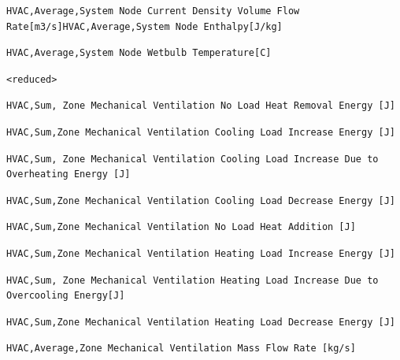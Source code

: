 \begin{lstlisting}
HVAC,Average,System Node Current Density Volume Flow Rate[m3/s]HVAC,Average,System Node Enthalpy[J/kg]
\end{lstlisting}

\begin{lstlisting}
HVAC,Average,System Node Wetbulb Temperature[C]
\end{lstlisting}

\begin{lstlisting}
<reduced>
\end{lstlisting}

\begin{lstlisting}
HVAC,Sum, Zone Mechanical Ventilation No Load Heat Removal Energy [J]
\end{lstlisting}

\begin{lstlisting}
HVAC,Sum,Zone Mechanical Ventilation Cooling Load Increase Energy [J]
\end{lstlisting}

\begin{lstlisting}
HVAC,Sum, Zone Mechanical Ventilation Cooling Load Increase Due to Overheating Energy [J]
\end{lstlisting}

\begin{lstlisting}
HVAC,Sum,Zone Mechanical Ventilation Cooling Load Decrease Energy [J]
\end{lstlisting}

\begin{lstlisting}
HVAC,Sum,Zone Mechanical Ventilation No Load Heat Addition [J]
\end{lstlisting}

\begin{lstlisting}
HVAC,Sum,Zone Mechanical Ventilation Heating Load Increase Energy [J]
\end{lstlisting}

\begin{lstlisting}
HVAC,Sum, Zone Mechanical Ventilation Heating Load Increase Due to Overcooling Energy[J]
\end{lstlisting}

\begin{lstlisting}
HVAC,Sum,Zone Mechanical Ventilation Heating Load Decrease Energy [J]
\end{lstlisting}

\begin{lstlisting}
HVAC,Average,Zone Mechanical Ventilation Mass Flow Rate [kg/s]
\end{lstlisting}

